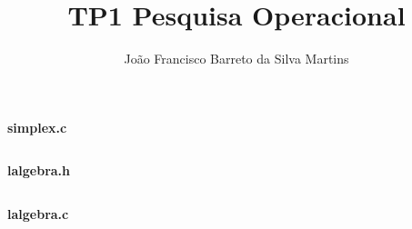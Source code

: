 \documentclass[10pt]{article}
\title{TP1 Pesquisa Operacional}
\author{João Francisco Barreto da Silva Martins}
\begin{document}
\maketitle

\textbf{simplex.c}
\inputminted[frame=lines,linenos,baselinestretch=1]{c++}{../simplex.c}
\textbf{lalgebra.h}
\inputminted[frame=lines,linenos,baselinestretch=1]{c++}{../lalgebra.h}
\textbf{lalgebra.c}
\inputminted[frame=lines,linenos,baselinestretch=1]{c++}{../lalgebra.h}
\end{document}
